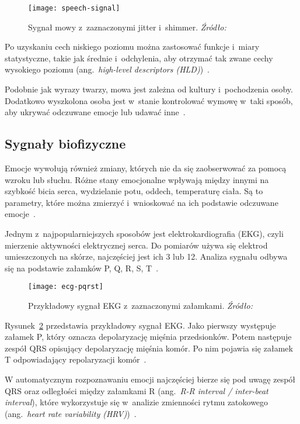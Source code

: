 \begin{figure}[h]
    \centering
    \texttt{[image: speech-signal]}
    \caption{Sygnał mowy z~zaznaczonymi jitter i~shimmer. \textit{Źródło:~\cite{Teixeira2013}}}
    \label{fig:speech-signal}
\end{figure}

Po uzyskaniu cech niskiego poziomu można zastosować funkcje i~miary statystyczne, takie jak średnie i~odchylenia, aby otrzymać tak zwane cechy wysokiego poziomu (ang.~\textit{high-level descriptors (HLD)})~\cite{Calvo2015}.

Podobnie jak wyrazy twarzy, mowa jest zależna od kultury i~pochodzenia osoby.
Dodatkowo wyszkolona osoba jest w~stanie kontrolować wymowę w~taki sposób, aby ukrywać odczuwane emocje lub udawać inne~\cite{Calvo2015}.

\subsection{Sygnały biofizyczne}\label{subsec:sygnaly-biofizyczne}

Emocje wywołują również zmiany, których nie da się zaobserwować za pomocą wzroku lub słuchu.
Różne stany emocjonalne wpływają między innymi na szybkość bicia serca, wydzielanie potu, oddech, temperaturę ciała.
Są to parametry, które można zmierzyć i~wnioskować na ich podstawie odczuwane emocje~\cite{Calvo2015}.

Jednym z~najpopularniejszych sposobów jest elektrokardiografia (EKG), czyli mierzenie aktywności elektrycznej serca.
Do pomiarów używa się elektrod umieszczonych na skórze, najczęściej jest ich 3 lub 12.
Analiza sygnału odbywa się na podstawie załamków P, Q, R, S, T~\cite{Calvo2015}.

\begin{figure}[h]
    \centering
    \texttt{[image: ecg-pqrst]}
    \caption{Przykładowy sygnał EKG z~zaznaczonymi załamkami. \textit{Źródło:~\cite{Dzedzickis2020}}}
    \label{fig:ecg-pqrst}
\end{figure}

Rysunek~\ref{fig:ecg-pqrst} przedstawia przykładowy sygnał EKG\@.
Jako pierwszy występuje załamek P, który oznacza depolaryzację mięśnia przedsionków.
Potem następuje zespół QRS opisujący depolaryzację mięśnia komór.
Po nim pojawia się załamek T odpowiadający repolaryzacji komór~\cite{Dzedzickis2020}.

W automatycznym rozpoznawaniu emocji najczęściej bierze się pod uwagę zespół QRS oraz odległości między załamkami R (ang.~\textit{R-R interval / inter-beat interval}), które wykorzystuje się w~analizie zmienności rytmu zatokowego (ang.~\textit{heart rate variability (HRV)})~\cite{Calvo2015}.


